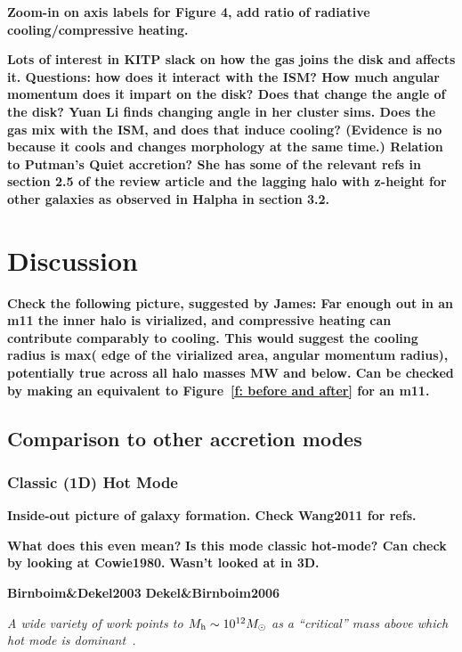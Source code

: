 \documentclass[fleqn,usenatbib]{mnras}
\begin{document}
\textbf{Zoom-in on axis labels for Figure 4, add ratio of radiative cooling/compressive heating.}

\textbf{
Lots of interest in KITP slack on how the gas joins the disk and affects it.
Questions: how does it interact with the ISM?
How much angular momentum does it impart on the disk? Does that change the angle of the disk? Yuan Li finds changing angle in her cluster sims.
Does the gas mix with the ISM, and does that induce cooling? (Evidence is no because it cools and changes morphology at the same time.)
Relation to Putman's Quiet accretion? She has some of the relevant refs in section 2.5 of the review article and the lagging halo with z-height for other galaxies as observed in Halpha in section 3.2.
}

\section{Discussion}
\label{s: discussion}

\textbf{
Check the following picture, suggested by James:
Far enough out in an m11 the inner halo is virialized, and compressive heating can contribute comparably to cooling.
This would suggest the cooling radius is max( edge of the virialized area, angular momentum radius), potentially true across all halo masses MW and below.
Can be checked by making an equivalent to Figure~\ref{f: before and after} for an m11.
}

\subsection{Comparison to other accretion modes}
\label{s: other modes}

\subsubsection{Classic (1D) Hot Mode}

\textbf{Inside-out picture of galaxy formation.
Check Wang2011 for refs.}

\textbf{What does this even mean?}
\textbf{Is this mode classic hot-mode? Can check by looking at Cowie1980.}
\textbf{Wasn't looked at in 3D.}

\textbf{Birnboim\&Dekel2003}
\textbf{Dekel\&Birnboim2006}

\textit{
A wide variety of work points to $M_{\rm h} \sim 10^{12} M_\odot$ as a ``critical'' mass above which hot mode is dominant~\citep[e.g.][]{Correa2017}.
}
\end{document}
